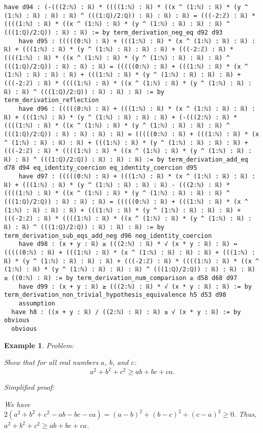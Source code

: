 \documentclass{article}
\newtheorem{example}{Example}
\begin{document}
\begin{tcolorbox}[colback=white!10, width=\linewidth]
\begin{lstlisting}[language=Lean4]
    have d94 : (-(((2:ℕ) : ℝ) * ((((1:ℕ) : ℝ) * ((x ^ (1:ℕ) : ℝ) * (y ^ (1:ℕ) : ℝ) : ℝ) : ℝ) ^ (((1:ℚ)/2:ℚ)) : ℝ) : ℝ) : ℝ) = (((-2:ℤ) : ℝ) * ((((1:ℕ) : ℝ) * ((x ^ (1:ℕ) : ℝ) * (y ^ (1:ℕ) : ℝ) : ℝ) : ℝ) ^ (((1:ℚ)/2:ℚ)) : ℝ) : ℝ) := by term_derivation_neg_eq d92 d93
    have d95 : (((((0:ℕ) : ℝ) + (((1:ℕ) : ℝ) * (x ^ (1:ℕ) : ℝ) : ℝ) : ℝ) + (((1:ℕ) : ℝ) * (y ^ (1:ℕ) : ℝ) : ℝ) : ℝ) + (((-2:ℤ) : ℝ) * ((((1:ℕ) : ℝ) * ((x ^ (1:ℕ) : ℝ) * (y ^ (1:ℕ) : ℝ) : ℝ) : ℝ) ^ (((1:ℚ)/2:ℚ)) : ℝ) : ℝ) : ℝ) = (((((0:ℕ) : ℝ) + (((1:ℕ) : ℝ) * (x ^ (1:ℕ) : ℝ) : ℝ) : ℝ) + (((1:ℕ) : ℝ) * (y ^ (1:ℕ) : ℝ) : ℝ) : ℝ) + (((-2:ℤ) : ℝ) * ((((1:ℕ) : ℝ) * ((x ^ (1:ℕ) : ℝ) * (y ^ (1:ℕ) : ℝ) : ℝ) : ℝ) ^ (((1:ℚ)/2:ℚ)) : ℝ) : ℝ) : ℝ) := by term_derivation_reflection
    have d96 : (((((0:ℕ) : ℝ) + (((1:ℕ) : ℝ) * (x ^ (1:ℕ) : ℝ) : ℝ) : ℝ) + (((1:ℕ) : ℝ) * (y ^ (1:ℕ) : ℝ) : ℝ) : ℝ) + (-(((2:ℕ) : ℝ) * ((((1:ℕ) : ℝ) * ((x ^ (1:ℕ) : ℝ) * (y ^ (1:ℕ) : ℝ) : ℝ) : ℝ) ^ (((1:ℚ)/2:ℚ)) : ℝ) : ℝ) : ℝ) : ℝ) = (((((0:ℕ) : ℝ) + (((1:ℕ) : ℝ) * (x ^ (1:ℕ) : ℝ) : ℝ) : ℝ) + (((1:ℕ) : ℝ) * (y ^ (1:ℕ) : ℝ) : ℝ) : ℝ) + (((-2:ℤ) : ℝ) * ((((1:ℕ) : ℝ) * ((x ^ (1:ℕ) : ℝ) * (y ^ (1:ℕ) : ℝ) : ℝ) : ℝ) ^ (((1:ℚ)/2:ℚ)) : ℝ) : ℝ) : ℝ) := by term_derivation_add_eq d78 d94 eq_identity_coercion eq_identity_coercion d95
    have d97 : (((((0:ℕ) : ℝ) + (((1:ℕ) : ℝ) * (x ^ (1:ℕ) : ℝ) : ℝ) : ℝ) + (((1:ℕ) : ℝ) * (y ^ (1:ℕ) : ℝ) : ℝ) : ℝ) - (((2:ℕ) : ℝ) * ((((1:ℕ) : ℝ) * ((x ^ (1:ℕ) : ℝ) * (y ^ (1:ℕ) : ℝ) : ℝ) : ℝ) ^ (((1:ℚ)/2:ℚ)) : ℝ) : ℝ) : ℝ) = (((((0:ℕ) : ℝ) + (((1:ℕ) : ℝ) * (x ^ (1:ℕ) : ℝ) : ℝ) : ℝ) + (((1:ℕ) : ℝ) * (y ^ (1:ℕ) : ℝ) : ℝ) : ℝ) + (((-2:ℤ) : ℝ) * ((((1:ℕ) : ℝ) * ((x ^ (1:ℕ) : ℝ) * (y ^ (1:ℕ) : ℝ) : ℝ) : ℝ) ^ (((1:ℚ)/2:ℚ)) : ℝ) : ℝ) : ℝ) := by term_derivation_sub_eqs_add_neg d96 neg_identity_coercion
    have d98 : (x + y : ℝ) ≥ (((2:ℕ) : ℝ) * √ (x * y : ℝ) : ℝ) ↔ (((((0:ℕ) : ℝ) + (((1:ℕ) : ℝ) * (x ^ (1:ℕ) : ℝ) : ℝ) : ℝ) + (((1:ℕ) : ℝ) * (y ^ (1:ℕ) : ℝ) : ℝ) : ℝ) + (((-2:ℤ) : ℝ) * ((((1:ℕ) : ℝ) * ((x ^ (1:ℕ) : ℝ) * (y ^ (1:ℕ) : ℝ) : ℝ) : ℝ) ^ (((1:ℚ)/2:ℚ)) : ℝ) : ℝ) : ℝ) ≥ ((0:ℕ) : ℝ) := by term_derivation_num_comparison ≥ d58 d68 d97
    have d99 : (x + y : ℝ) ≥ (((2:ℕ) : ℝ) * √ (x * y : ℝ) : ℝ) := by term_derivation_non_trivial_hypothesis_equivalence h5 d53 d98
    assumption
  have h8 : ((x + y : ℝ) / ((2:ℕ) : ℝ) : ℝ) ≥ √ (x * y : ℝ) := by obvious
  obvious

\end{lstlisting}
\end{tcolorbox}


\begin{example}
Problem:
\begin{tcolorbox}[colback=yellow!10, width=\linewidth]
Show that for all real numbers $a$, $b$, and $c$:
    $$a^2 + b^2 + c^2 \geq ab + bc + ca.$$
\end{tcolorbox}

Simplified proof:
\begin{tcolorbox}[colback=blue!10, width=\linewidth]
We have $2(a^2 + b^2 + c^2 - ab - bc - ca) = (a-b)^2 + (b-c)^2 + (c-a)^2 \ge 0$. Thus, $a^2 + b^2 + c^2 \geq ab + bc + ca$.
\end{tcolorbox}
\end{example}
\end{document}
